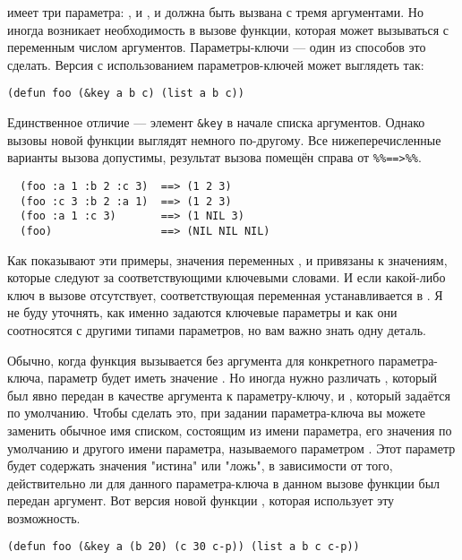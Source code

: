 имеет три параметра: ,  и , и должна быть вызвана с тремя
аргументами. Но иногда возникает необходимость в вызове функции, которая может вызываться
с переменным числом аргументов. Параметры-ключи --- один из способов это сделать. Версия
 с использованием параметров-ключей может выглядеть так:

\begin{lstlisting}
(defun foo (&key a b c) (list a b c))
\end{lstlisting}

Единственное отличие --- элемент \lstinline!&key! в начале списка аргументов. Однако вызовы
новой функции  выглядят немного по-другому. Все нижеперечисленные варианты
вызова  допустимы, результат вызова помещён справа от \lstinline!%%==>%%!.

\begin{verbatim}
  (foo :a 1 :b 2 :c 3)  ==> (1 2 3)
  (foo :c 3 :b 2 :a 1)  ==> (1 2 3)
  (foo :a 1 :c 3)       ==> (1 NIL 3)
  (foo)                 ==> (NIL NIL NIL)
\end{verbatim}

Как показывают эти примеры, значения переменных ,  и  привязаны
к значениям, которые следуют за соответствующими ключевыми словами. И если какой-либо
ключ в вызове отсутствует, соответствующая переменная устанавливается в . Я не
буду уточнять, как именно задаются ключевые параметры и как они соотносятся с другими
типами параметров, но вам важно знать одну деталь.

Обычно, когда функция вызывается без аргумента для конкретного параметра-ключа, параметр
будет иметь значение . Но иногда нужно различать , который был явно
передан в качестве аргумента к параметру-ключу, и , который задаётся по
умолчанию. Чтобы сделать это, при задании параметра-ключа вы можете заменить обычное имя
списком, состоящим из имени параметра, его значения по умолчанию и другого имени
параметра, называемого параметром . Этот параметр  будет
содержать значения "истина" или "ложь", в зависимости от того, действительно ли для
данного параметра-ключа в данном вызове функции был передан аргумент. Вот версия новой
функции , которая использует эту возможность.

\begin{lstlisting}
(defun foo (&key a (b 20) (c 30 c-p)) (list a b c c-p))
\end{lstlisting}

